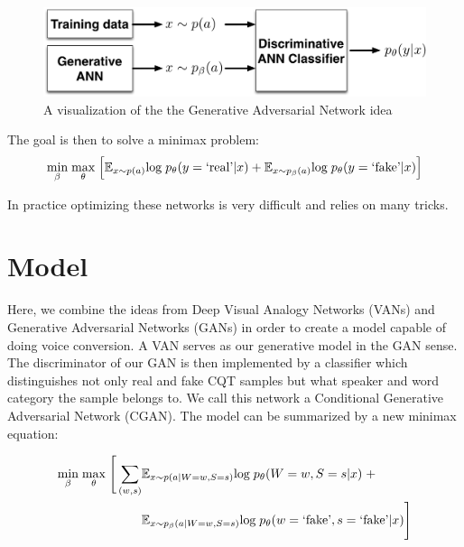 \documentclass{article}
\begin{document}
\begin{figure}[h]
    \centering
    \includegraphics[scale=0.40]{adversarial_network.png}
    \caption{A visualization of the the Generative Adversarial Network idea}
    \label{adversarial_network}
\end{figure}

The goal is then to solve a minimax problem:
\begin{eqnarray*}
\underset{\beta}{\text{min}} \hspace{1mm} \underset{\theta}{\text{max}} \hspace{1mm} \Big[ \mathbb{E}_{x \sim p(a)} \text{log} \hspace{1mm} p_{\theta} (y=\text{`real’}|x) + \mathbb{E}_{x \sim p_{\beta}(a)} \text{log} \hspace{1mm} p_{\theta} (y=\text{`fake’}|x) \Big]
\end{eqnarray*}

In practice optimizing these networks is very difficult and relies on many tricks.

\section{Model}
Here, we combine the ideas from Deep Visual Analogy Networks (VANs) and Generative Adversarial Networks (GANs) in order to create a model capable of doing voice conversion. A VAN serves as our generative model in the GAN sense. The discriminator of our GAN is then implemented by a classifier which distinguishes not only real and fake CQT samples but what speaker and word category the sample belongs to. We call this network a Conditional Generative Adversarial Network (CGAN). The model can be summarized by a new minimax equation:

\begin{eqnarray*}
\underset{\beta}{\text{min}} \hspace{1mm} \underset{\theta}{\text{max}} \hspace{1mm} \Bigg[ \sum_{(w,s)} &\mathbb{E}_{x \sim p(a|W=w,S=s)} \text{log} \hspace{1mm} p_{\theta} (W=w, S=s|x) \hspace{1mm} + \\
&\mathbb{E}_{x \sim p_{\beta}(a|W=w,S=s)} \text{log} \hspace{1mm} p_{\theta} (w=\text{`fake'}, s=\text{`fake'}|x) \Bigg]
\end{eqnarray*}
\end{document}
